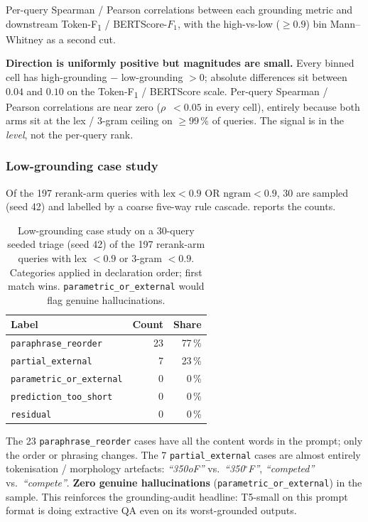 \documentclass[11pt,a4paper]{article}
\newcommand{\F}{F\textsubscript{1}}
\newcommand{\Tokenf}{Token-\F}
\newcommand{\bertscore}{BERTScore}
\begin{document}
Per-query Spearman / Pearson correlations between each grounding
metric and downstream \Tokenf{} / \bertscore{}-$F_1$, with the
high-vs-low ($\geq\!0.9$) bin Mann--Whitney as a second cut.

\textbf{Direction is uniformly positive but magnitudes are small.}
Every binned cell has high-grounding $-$ low-grounding $>\!0$;
absolute differences sit between $0.04$ and $0.10$ on the
\Tokenf{} / \bertscore{} scale.  Per-query Spearman / Pearson
correlations are near zero (\textbar$\rho$\textbar~$<\!0.05$ in
every cell), entirely because both arms sit at the lex / 3-gram
ceiling on $\geq\!99\,\%$ of queries.  The signal is in the
\emph{level}, not the per-query rank.

\subsubsection{Low-grounding case study}

Of the 197 rerank-arm queries with $\mathrm{lex}\!<\!0.9$ OR
$\mathrm{ngram}\!<\!0.9$, 30 are sampled (seed 42) and labelled by
a coarse five-way rule cascade.   reports the
counts.

\begin{table}[H]
  \centering
  \caption{Low-grounding case study on a 30-query seeded
  triage (seed 42) of the 197 rerank-arm queries with
  lex $<\!0.9$ or 3-gram $<\!0.9$.  Categories applied in
  declaration order; first match wins.
  \texttt{parametric\_or\_external} would flag genuine
  hallucinations.}
  \label{tab:w7d}
  \begin{tabular}{lrr}
    \toprule
    Label                       & Count & Share \\
    \midrule
    \texttt{paraphrase\_reorder}     & 23 & 77\,\% \\
    \texttt{partial\_external}       &  7 & 23\,\% \\
    \texttt{parametric\_or\_external} & 0 &  0\,\% \\
    \texttt{prediction\_too\_short}  &  0 &  0\,\% \\
    \texttt{residual}                &  0 &  0\,\% \\
    \bottomrule
  \end{tabular}
\end{table}

The 23 \texttt{paraphrase\_reorder} cases have all the content
words in the prompt; only the order or phrasing changes.  The 7
\texttt{partial\_external} cases are almost entirely
tokenisation / morphology artefacts: \emph{``350oF''} vs.\
\emph{``350$^\circ$F''}, \emph{``competed''} vs.\ \emph{``compete''}.
\textbf{Zero genuine hallucinations} (\texttt{parametric\_or\_external})
in the sample.  This reinforces the grounding-audit headline: T5-small on this
prompt format is doing extractive QA even on its worst-grounded
outputs.
\end{document}
